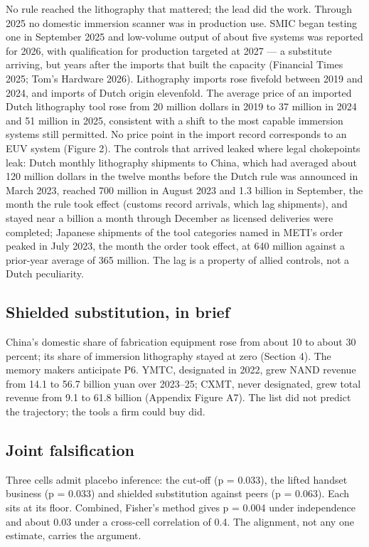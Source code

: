 \documentclass[12pt]{article}
\begin{document}
No rule reached the lithography that mattered; the lead did the work. Through 2025 no domestic immersion scanner was in production use. SMIC began testing one in September 2025 and low-volume output of about five systems was reported for 2026, with qualification for production targeted at 2027 --- a substitute arriving, but years after the imports that built the capacity (Financial Times 2025; Tom's Hardware 2026). Lithography imports rose fivefold between 2019 and 2024, and imports of Dutch origin elevenfold. The average price of an imported Dutch lithography tool rose from 20 million dollars in 2019 to 37 million in 2024 and 51 million in 2025, consistent with a shift to the most capable immersion systems still permitted. No price point in the import record corresponds to an EUV system (Figure 2). The controls that arrived leaked where legal chokepoints leak: Dutch monthly lithography shipments to China, which had averaged about 120 million dollars in the twelve months before the Dutch rule was announced in March 2023, reached 700 million in August 2023 and 1.3 billion in September, the month the rule took effect (customs record arrivals, which lag shipments), and stayed near a billion a month through December as licensed deliveries were completed; Japanese shipments of the tool categories named in METI's order peaked in July 2023, the month the order took effect, at 640 million against a prior-year average of 365 million. The lag is a property of allied controls, not a Dutch peculiarity.

\subsection{Shielded substitution, in brief}

China's domestic share of fabrication equipment rose from about 10 to about 30 percent; its share of immersion lithography stayed at zero (Section 4). The memory makers anticipate P6. YMTC, designated in 2022, grew NAND revenue from 14.1 to 56.7 billion yuan over 2023--25; CXMT, never designated, grew total revenue from 9.1 to 61.8 billion (Appendix Figure A7). The list did not predict the trajectory; the tools a firm could buy did.

\subsection{Joint falsification}

Three cells admit placebo inference: the cut-off (p = 0.033), the lifted handset business (p = 0.033) and shielded substitution against peers (p = 0.063). Each sits at its floor. Combined, Fisher's method gives p = 0.004 under independence and about 0.03 under a cross-cell correlation of 0.4. The alignment, not any one estimate, carries the argument.
\end{document}
